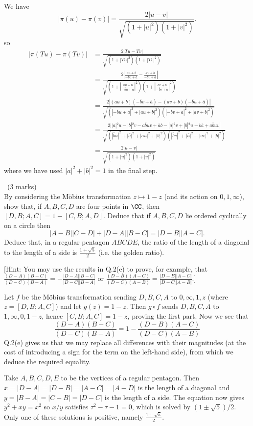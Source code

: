 \documentclass[12pt]{article}
\begin{document}
\begin{answer}
  We have
  \[|\pi(u)-\pi(v)|=\frac{2|u-v|}{\sqrt{(1+|u|^2)(1+|v|^2)}}.\]
  so
  \begin{align*}
    |\pi(Tu)-\pi(Tv)|&=\frac{2|Tu-Tv|}{\sqrt{(1+|Tu|^2)(1+|Tv|^2)}}\\
    &=\frac{2\left|\frac{au+b}{-\bar{b}u+\bar{a}}-\frac{av+b}{-\bar{b}v+\bar{a}}\right|}{\sqrt{\left(1+\left|\frac{au+b}{-\bar{b}u+\bar{a}}\right|^2\right)\left(1+\left|\frac{av+b}{-\bar{b}v+\bar{a}}\right|^2\right)}}\\
    &=\frac{2|(au+b)(-\bar{b}v+\bar{a})-(av+b)(-\bar{b}u+\bar{a})|}{\sqrt{(|-\bar{b}u+\bar{a}|^2+|au+b|^2)(|-\bar{b}v+\bar{a}|^2+|av+b|^2)}}\\
    &=\frac{2||a|^2u-|b|^2v-a\bar{b}uv+\bar{a}b-|a|^2v+|b|^2u-b\bar{a}+a\bar{b}uv|}{\sqrt{(|\bar{b}u|^2+|\bar{a}|^2+|au|^2+|b|^2)(|\bar{b}v|^2+|\bar{a}|^2+|av|^2+|b|^2)}}\\
    &=\frac{2|u-v|}{\sqrt{(1+|u|^2)(1+|v|^2)}}
  \end{align*}
  where we have used $|a|^2+|b|^2=1$ in the final step.
\end{answer}
\newpage

\vspace{1cm}

\begin{question}\ (3 marks)\\
  By considering the M\"obius transformation $z\mapsto 1-z$ (and its action on $0,1,\infty$), show that, if $A,B,C,D$ are four points in $\CC$, then $[D,B;A,C]=1-[C,B;A,D]$. Deduce that if $A,B,C,D$ lie ordered cyclically on a circle then
  \[|A-B||C-D|+|D-A||B-C|=|D-B||A-C|.\]
  Deduce that, in a regular pentagon $ABCDE$, the ratio of the length of a diagonal to the length of a side is $\frac{1+\sqrt{5}}{2}$ (i.e. the golden ratio).

  [Hint: You may use the results in Q.2(e) to prove, for example, that $\frac{(D-A)(B-C)}{(D-C)(B-A)}=-\frac{|D-A||B-C|}{|D-C||B-A|}$ or $\frac{(D-B)(A-C)}{(D-C)(A-B)}=\frac{|D-B||A-C|}{|D-C||A-B|}$.]
\end{question}

\begin{answer}
  Let $f$ be the M\"obius transformation sending $D,B,C,A$ to $0,\infty,1,z$ (where $z=[D,B;A,C]$) and let $g(z)=1-z$. Then $g\circ f$ sends $D,B,C,A$ to $1,\infty,0,1-z$, hence $[C,B;A,C]=1-z$, proving the first part. Now we see that
  \[\frac{(D-A)(B-C)}{(D-C)(B-A)}=1-\frac{(D-B)(A-C)}{(D-C)(A-B)}\]
  Q.2(e) gives us that we may replace all differences with their magnitudes (at the cost of introducing a sign for the term on the left-hand side), from which we deduce the required equality.

  Take $A,B,C,D,E$ to be the vertices of a regular pentagon. Then $x=|D-A|=|D-B|=|A-C|=|A-D|$ is the length of a diagonal and $y=|B-A|=|C-B|=|D-C|$ is the length of a side. The equation now gives $y^2+xy=x^2$ so $x/y$ satisfies $\tau^2-\tau-1=0$, which is solved by $(1\pm\sqrt{5})/2$. Only one of these solutions is positive, namely $\frac{1+\sqrt{5}}{2}$.
\end{answer}
\newpage
\end{document}
